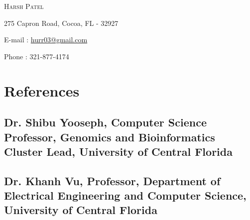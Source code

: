 \documentclass{my_references_class}
\newcommand{\name}[1]{
   \centerline{\textsc{\huge{#1}}}
}
\newcommand{\contact}[1]{
   \centerline{\normalsize{#1}}
}
\begin{document}
\name{Harsh Patel}
\vspace{0.1cm}
\contact{275 Capron Road, Cocoa, FL - 32927}
\vspace{0.05cm}
\contact{E-mail : \href{mailto:hurr03@gmail.com}{hurr03@gmail.com}}
\vspace{0.05cm}
\contact{Phone : 321-877-4174 }

\section{References}
\subsection{\textbf{Dr. Shibu Yooseph}, Computer Science Professor, Genomics and Bioinformatics Cluster Lead, University of Central Florida}
\subsection{\textbf{Dr. Khanh Vu}, Professor, Department of Electrical Engineering and Computer Science, University of Central Florida}
\end{document}
